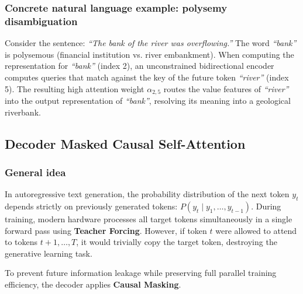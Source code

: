 \documentclass[../../../main.tex]{subfiles}
\begin{document}
\subsubsection{Concrete natural language example: polysemy disambiguation}
Consider the sentence: \emph{``The bank of the river was overflowing.''}
The word \emph{``bank''} is polysemous (financial institution vs. river embankment). When computing the representation for \emph{``bank''} (index 2), an unconstrained bidirectional encoder computes queries that match against the key of the future token \emph{``river''} (index 5). The resulting high attention weight $\alpha_{2, 5}$ routes the value features of \emph{``river''} into the output representation of \emph{``bank''}, resolving its meaning into a geological riverbank.

\subsection{Decoder Masked Causal Self-Attention}
\label{subsec:masked_causal_self_attn}

\subsubsection{General idea}
In autoregressive text generation, the probability distribution of the next token $y_t$ depends strictly on previously generated tokens: $P(y_t \mid y_1, \dots, y_{t-1})$. During training, modern hardware processes all target tokens simultaneously in a single forward pass using \textbf{Teacher Forcing}. However, if token $t$ were allowed to attend to tokens $t+1, \dots, T$, it would trivially copy the target token, destroying the generative learning task.

To prevent future information leakage while preserving full parallel training efficiency, the decoder applies \textbf{Causal Masking}.
\end{document}
